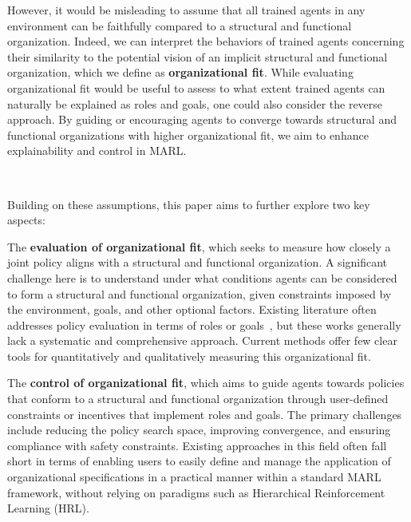 \documentclass[sigconf]{aamas}
\begin{document}
However, it would be misleading to assume that all trained agents in any environment can be faithfully compared to a structural and functional organization. Indeed, we can interpret the behaviors of trained agents concerning their similarity to the potential vision of an implicit structural and functional organization, which we define as \textbf{organizational fit}.
While evaluating organizational fit would be useful to assess to what extent trained agents can naturally be explained as roles and goals, one could also consider the reverse approach. By guiding or encouraging agents to converge towards structural and functional organizations with higher organizational fit, we aim to enhance explainability and control in MARL.

\

Building on these assumptions, this paper aims to further explore two key aspects:
\begin{enumerate*}[label={\roman*) },itemjoin={; \quad}]
    \item The \textbf{evaluation of organizational fit}, which seeks to measure how closely a joint policy aligns with a structural and functional organization. A significant challenge here is to understand under what conditions agents can be considered to form a structural and functional organization, given constraints imposed by the environment, goals, and other optional factors.
    Existing literature often addresses policy evaluation in terms of roles or goals~\cite{Isakov2024, Wen2024, Xie2024}, but these works generally lack a systematic and comprehensive approach. Current methods offer few clear tools for quantitatively and qualitatively measuring this organizational fit.
    \item The \textbf{control of organizational fit}, which aims to guide agents towards policies that conform to a structural and functional organization through user-defined constraints or incentives that implement roles and goals.
    The primary challenges include reducing the policy search space, improving convergence, and ensuring compliance with safety constraints.
    Existing approaches in this field often fall short in terms of enabling users to easily define and manage the application of organizational specifications in a practical manner within a standard MARL framework, without relying on paradigms such as Hierarchical Reinforcement Learning (HRL).
\end{enumerate*}

\
\end{document}
